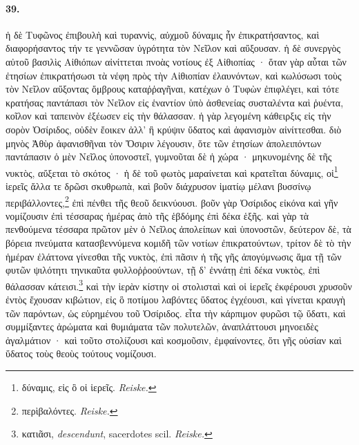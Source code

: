 \documentclass[a4paper, 11pt, oneside, polutonikogreek, german, landscape]{article}
\begin{document}
\paragraph{39.}
ἡ δὲ Τυφῶνος ἐπιβουλὴ καὶ τυραννὶς, αὐχμοῦ δύναμις ἦν ἐπικρατήσαντος, καὶ διαφορήσαντος τήν τε γεννῶσαν ὑγρότητα τὸν Νεῖλον καὶ αὔξουσαν. ἡ δὲ συνεργὸς αὐτοῦ βασιλὶς Αἰθιόπων αἰνίττεται πνοὰς νοτίους ἐξ Αἰθιοπίας · ὅταν γὰρ αὗται τῶν ἐτησίων ἐπικρατήσωσι τὰ νέφη πρὸς τὴν Αἰθιοπίαν ἐλαυνόντων, καὶ κωλύσωσι τοὺς τὸν Νεῖλον αὔξοντας ὄμβρους καταῤῥαγῆναι, κατέχων ὁ Τυφὼν ἐπιφλέγει, καὶ τότε κρατήσας παντάπασι τὸν Νεῖλον εἰς ἑναντίον ὑπὸ ἀσθενείας συσταλέντα καὶ ῥυέντα, κοῖλον καὶ ταπεινὸν ἐξέωσεν εἰς τὴν θάλασσαν. ἡ γὰρ λεγομένη κάθειρξις εἰς τὴν σορὸν Ὀσίριδος, οὐδὲν ἔοικεν ἀλλ' ἢ κρύψιν ὕδατος καὶ ἀφανισμὸν αἰνίττεσθαι. διὸ μηνὸς Ἀθὺρ ἀφανισθῆναι τὸν Ὄσιριν λέγουσιν, ὅτε τῶν ἐτησίων ἀπολειπόντων παντάπασιν ὁ μὲν Νεῖλος ὑπονοστεῖ, γυμνοῦται δὲ ἡ χώρα · μηκυνομένης δὲ τῆς νυκτὸς, αὔξεται τὸ σκότος · ἡ δὲ τοῦ φωτὸς μαραίνεται καὶ κρατεῖται δύναμις, οἱ\footnote{δύναμις, εἰς ὃ οἱ ἱερεῖς. \emph{Reiske.}} ἱερεῖς ἄλλα τε δρῶσι σκυθρωπὰ, καὶ βοῦν διάχρυσον ἱματίῳ μέλανι βυσσίνῳ περιβάλλοντες,\footnote{περὶβαλόντες. \emph{Reiske.}} ἐπὶ πένθει τῆς θεοῦ δεικνύουσι. βοῦν γὰρ Ὀσίριδος εἰκόνα καὶ γῆν νομίζουσιν ἐπὶ τέσσαρας ἡμέρας ἀπὸ τῆς ἑβδόμης ἐπὶ δέκα ἑξῆς. καὶ γὰρ τὰ πενθούμενα τέσσαρα πρῶτον μὲν ὁ Νεῖλος ἀπολείπων καὶ ὑπονοστῶν, δεύτερον δὲ, τὰ βόρεια πνεύματα κατασβεννύμενα κομιδῆ τῶν νοτίων ἐπικρατούντων, τρίτον δὲ τὸ τὴν ἡμέραν ἐλάττονα γίνεσθαι τῆς νυκτὸς, ἐπὶ πᾶσιν ἡ τῆς γῆς ἀπογύμνωσις ἅμα τῇ τῶν φυτῶν ψιλότητι τηνικαῦτα φυλλοῤῥοούντων, τῇ δ' ἐννάτῃ ἐπὶ δέκα νυκτὸς, ἐπὶ θάλασσαν κάτεισι.\footnote{κατιᾶσι, \emph{descendunt}, sacerdotes scil. \emph{Reiske.}} καὶ τὴν ἱερὰν κίστην οἱ στολισταὶ καὶ οἱ ἱερεῖς ἐκφέρουσι χρυσοῦν ἐντὸς ἔχουσαν κιβώτιον, εἰς ὃ ποτίμου λαβόντες ὕδατος ἐγχέουσι, καὶ γίνεται κραυγὴ τῶν παρόντων, ὡς εὑρημένου τοῦ Ὀσίριδος. εἶτα τὴν κάρπιμον φυρῶσι τῷ ὕδατι, καὶ συμμίξαντες ἀρώματα καὶ θυμιάματα τῶν πολυτελῶν, ἀναπλάττουσι μηνοειδὲς ἀγαλμάτιον · καὶ τοῦτο στολίζουσι καὶ κοσμοῦσιν, ἐμφαίνοντες, ὅτι γῆς οὐσίαν καὶ ὕδατος τοὺς θεοὺς τούτους νομίζουσι.
\end{document}
